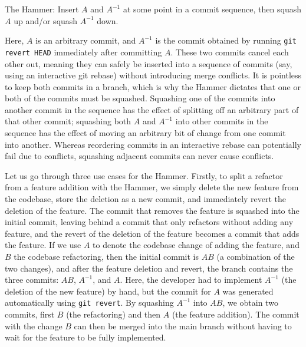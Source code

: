 \documentclass[a4paper]{lipics-v2021}
\begin{document}
\begin{definition}
The Hammer: Insert $A$ and $A^{-1}$ at some point in a commit sequence, then squash $A$ up and/or squash $A^{-1}$ down.
\end{definition}
Here, $A$ is an arbitrary commit, and $A^{-1}$ is the commit obtained by running \verb`git revert HEAD` immediately after committing $A$.
These two commits cancel each other out, meaning they can safely be inserted into a sequence of commits (say, using an interactive git rebase) without introducing merge conflicts.
It is pointless to keep both commits in a branch, which is why the Hammer dictates that one or both of the commits must be squashed.
Squashing one of the commits into another commit in the sequence has the effect of splitting off an arbitrary part of that other commit;
squashing both $A$ and $A^{-1}$ into other commits in the sequence has the effect of moving an arbitrary bit of change from one commit into another.
Whereas reordering commits in an interactive rebase can potentially fail due to conflicts, squashing adjacent commits can never cause conflicts.

Let us go through three use cases for the Hammer. Firstly, to split a refactor from a feature addition with the Hammer, we simply delete the new feature from the codebase, store the deletion as a new commit, and immediately revert the deletion of the feature. The commit that removes the feature is squashed into the initial commit, leaving behind a commit that only refactors without adding any feature, and the revert of the deletion of the feature becomes a commit that adds the feature. If we use $A$ to denote the codebase change of adding the feature, and $B$ the codebase refactoring, then the initial commit is $A B$ (a combination of the two changes), and after the feature deletion and revert, the branch contains the three commits: $A B$, $A^{-1}$, and $A$. Here, the developer had to implement $A^{-1}$ (the deletion of the new feature) by hand, but the commit for $A$ was generated automatically using \verb`git revert`. By squashing $A^{-1}$ into $A B$, we obtain two commits, first $B$ (the refactoring) and then $A$ (the feature addition). The commit with the change $B$ can then be merged into the main branch without having to wait for the feature to be fully implemented.
\end{document}
